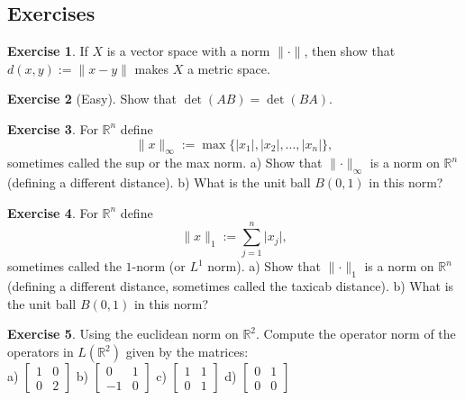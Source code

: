 \documentclass[12pt]{book}
\newcommand{\sabs}[1]{\lvert {#1} \rvert}
\newcommand{\snorm}[1]{\lVert {#1} \rVert}
\newcommand{\abs}[1]{\left\lvert {#1} \right\rvert}
\newcommand{\R}{{\mathbb{R}}}
\theoremstyle{plain}
\theoremstyle{remark}
\theoremstyle{definition}
\theoremstyle{exercise}
\newtheorem{exercise}{Exercise}[section]
\theoremstyle{example}
\begin{document}
\subsection{Exercises}

\begin{exercise}
If $X$ is a vector space with a norm $\snorm{\cdot}$, then show that
$d(x,y) := \snorm{x-y}$ makes $X$ a metric space.
\end{exercise}

\begin{exercise}[Easy]
Show that $\det(AB) = \det(BA)$.
\end{exercise}

\begin{exercise}
For $\R^n$ define
\begin{equation*}
\snorm{x}_{\infty} := \max \{ \abs{x_1}, \abs{x_2}, \ldots, \abs{x_n} \} ,
\end{equation*}
sometimes called the sup or the max norm.
a) Show that $\snorm{\cdot}_\infty$ is a norm on $\R^n$ (defining a different
distance).
b) What is the unit ball $B(0,1)$ in this norm?
\end{exercise}

\begin{exercise}
For $\R^n$ define
\begin{equation*}
\snorm{x}_{1} := \sum_{j=1}^n \sabs{x_j},
\end{equation*}
sometimes called the $1$-norm (or $L^1$ norm).
a) Show that $\snorm{\cdot}_1$ is a norm on $\R^n$ (defining a different
distance, sometimes called the taxicab distance).
b) What is the unit ball $B(0,1)$ in this norm?
\end{exercise}

\begin{exercise}
Using the euclidean norm on $\R^2$.  Compute the operator norm of the
operators in $L(\R^2)$ given by the matrices:
\\
a)
$\left[
\begin{smallmatrix}
1 & 0 \\
0 & 2
\end{smallmatrix}
\right]$
\quad
b)
$\left[
\begin{smallmatrix}
0 & 1 \\
-1 & 0
\end{smallmatrix}
\right]$
\quad
c)
$\left[
\begin{smallmatrix}
1 & 1 \\
0 & 1
\end{smallmatrix}
\right]$
\quad
d)
$\left[
\begin{smallmatrix}
0 & 1 \\
0 & 0
\end{smallmatrix}
\right]$
\end{exercise}
\end{document}
